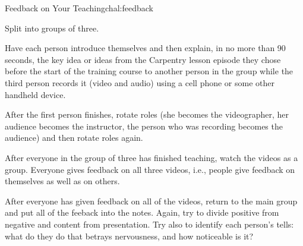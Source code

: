 \begin{challenge}{Feedback on Your Teaching}{chal:feedback}

\begin{genumerate}

\item
  Split into groups of three.

\item
  Have each person introduce themselves and then explain, in no more
  than 90 seconds, the key idea or ideas from the Carpentry lesson
  episode they chose before the start of the training course to another
  person in the group while the third person records it (video and
  audio) using a cell phone or some other handheld device.

\item
  After the first person finishes, rotate roles (she becomes the
  videographer, her audience becomes the instructor, the person who was
  recording becomes the audience) and then rotate roles again.

\item
  After everyone in the group of three has finished teaching, watch the
  videos as a group. Everyone gives feedback on all three videos, i.e.,
  people give feedback on themselves as well as on others.

\item
  After everyone has given feedback on all of the videos, return to the
  main group and put all of the feeback into the notes.  Again, try to
  divide positive from negative and content from presentation.  Try
  also to identify each person's tells: what do they do that betrays
  nervousness, and how noticeable is it?

\end{genumerate}

\end{challenge}

